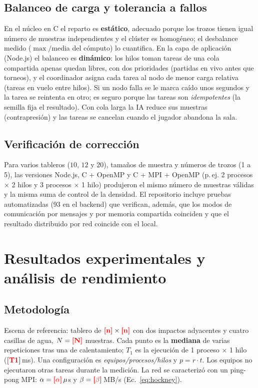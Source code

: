 \documentclass[conference]{IEEEtran}
\newcommand{\TODO}[1]{\textcolor{red}{\textbf{[#1]}}}
\newcommand{\AlphaUs}{\TODO{$\alpha$}}\newcommand{\BetaMBps}{\TODO{$\beta$}}
\newcommand{\TUnoMs}{\TODO{T1}}\newcommand{\KarpFlattMedio}{\TODO{e}}\newcommand{\AmdahlF}{\TODO{f}}
\newcommand{\MuestrasFuerte}{\TODO{N}}\newcommand{\TableroLado}{\TODO{n}}
\begin{document}
\subsection{Balanceo de carga y tolerancia a fallos}
En el n\'ucleo en C el reparto es \textbf{est\'atico}, adecuado porque los trozos tienen igual n\'umero de muestras independientes y el cl\'uster es homog\'eneo; el desbalance medido ($\max/$media del c\'omputo) lo cuantifica. En la capa de aplicaci\'on (Node.js) el balanceo es \textbf{din\'amico}: los hilos toman tareas de una cola compartida apenas quedan libres, con dos prioridades (partidas en vivo antes que torneos), y el coordinador asigna cada tarea al nodo de menor carga relativa (tareas en vuelo entre hilos). Si un nodo falla se le marca ca\'ido unos segundos y la tarea se reintenta en otro; es seguro porque las tareas son \emph{idempotentes} (la semilla fija el resultado). Con cola larga la IA reduce sus muestras (contrapresi\'on) y las tareas se cancelan cuando el jugador abandona la sala.

\subsection{Verificaci\'on de correcci\'on}
Para varios tableros ($10$, $12$ y $20$), tama\~nos de muestra y n\'umeros de trozos (1 a 5), las versiones Node.js, C + OpenMP y C + MPI + OpenMP (p.\,ej. 2 procesos $\times$ 2 hilos y 3 procesos $\times$ 1 hilo) produjeron el mismo n\'umero de muestras v\'alidas y la misma suma de control de la densidad. El repositorio incluye pruebas automatizadas (93 en el backend) que verifican, adem\'as, que los modos de comunicaci\'on por mensajes y por memoria compartida coinciden y que el resultado distribuido por red coincide con el local.

\section{Resultados experimentales y an\'alisis de rendimiento}
\subsection{Metodolog\'ia}
Escena de referencia: tablero de $\TableroLado\times\TableroLado$ con dos impactos adyacentes y cuatro casillas de agua, $N=\MuestrasFuerte$ muestras. Cada punto es la \textbf{mediana} de varias repeticiones tras una de calentamiento; $T_1$ es la ejecuci\'on de 1 proceso $\times$ 1 hilo (\TUnoMs\,ms). Una configuraci\'on es \emph{equipos/procesos/hilos} y $p=r\cdot t$. Los equipos no ejecutaron otras tareas durante la medici\'on. La red se caracteriz\'o con un ping-pong MPI: $\alpha=\AlphaUs\,\mu$s y $\beta=\BetaMBps$\,MB/s (Ec.~\ref{eq:hockney}).
\end{document}
